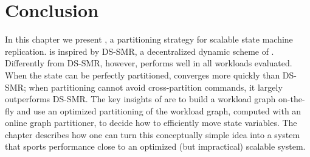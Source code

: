 \section{Conclusion}
\label{sec:dynastar-conclusion}

In this chapter we present \dynastar, a partitioning strategy for scalable state
machine replication. \dynastar is inspired by DS-SMR, a decentralized dynamic
scheme of \dssmr. Differently from DS-SMR, however, \dynastar performs well in
all workloads evaluated. When the state can be perfectly partitioned, \dynastar
converges more quickly than DS-SMR; when partitioning cannot avoid
cross-partition commands, it largely outperforms DS-SMR. The key insights of
\dynastar are to build a workload graph on-the-fly and use an optimized
partitioning of the workload graph, computed with an online graph partitioner,
to decide how to efficiently move state variables. The chapter describes how one
can turn this conceptually simple idea into a system that sports performance
close to an optimized (but impractical) scalable system.

